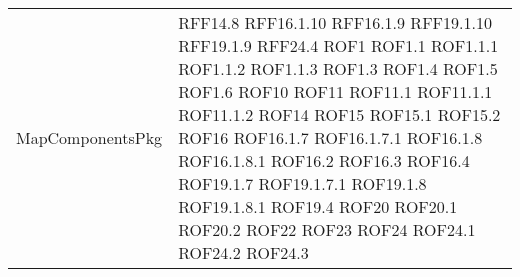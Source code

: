 \begin{longtable}{p{5cm}!{\VRule[1pt]}p{2.5cm}}
		MapComponentsPkg & RFF14.8 \newline RFF16.1.10 \newline RFF16.1.9 \newline RFF19.1.10 \newline RFF19.1.9 \newline RFF24.4 \newline ROF1 \newline ROF1.1 \newline ROF1.1.1 \newline ROF1.1.2 \newline ROF1.1.3 \newline ROF1.3 \newline ROF1.4 \newline ROF1.5 \newline ROF1.6 \newline ROF10 \newline ROF11 \newline ROF11.1 \newline ROF11.1.1 \newline ROF11.1.2 \newline ROF14 \newline ROF15 \newline ROF15.1 \newline ROF15.2 \newline ROF16 \newline ROF16.1.7 \newline ROF16.1.7.1 \newline ROF16.1.8 \newline ROF16.1.8.1 \newline ROF16.2 \newline ROF16.3 \newline ROF16.4 \newline ROF19.1.7 \newline ROF19.1.7.1 \newline ROF19.1.8 \newline ROF19.1.8.1 \newline ROF19.4 \newline ROF20 \newline ROF20.1 \newline ROF20.2 \newline ROF22 \newline ROF23 \newline ROF24 \newline ROF24.1 \newline ROF24.2 \newline ROF24.3 \\

\end{longtable}
